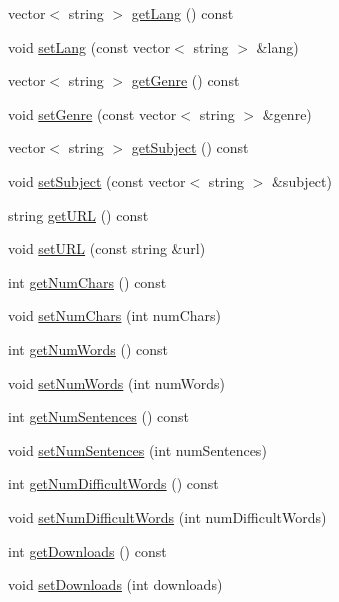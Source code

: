 \begin{DoxyCompactItemize}
\item 
vector$<$ string $>$ \hyperlink{classbridges_1_1_book_abb74d8c97070e1c3ead2d1223bfa420c}{get\+Lang} () const 
\item 
void \hyperlink{classbridges_1_1_book_a7c96cf79f310f78eb16035c6874afa05}{set\+Lang} (const vector$<$ string $>$ \&lang)
\item 
vector$<$ string $>$ \hyperlink{classbridges_1_1_book_a0a7091fa2f7501bac398bbe8fb88a2bd}{get\+Genre} () const 
\item 
void \hyperlink{classbridges_1_1_book_a3743b908548b944543af533b030a1eca}{set\+Genre} (const vector$<$ string $>$ \&genre)
\item 
vector$<$ string $>$ \hyperlink{classbridges_1_1_book_a16bde0ed60d0c3c3b2e3affd6de2f95a}{get\+Subject} () const 
\item 
void \hyperlink{classbridges_1_1_book_aff19a506929a6df5503e2cd3e293381e}{set\+Subject} (const vector$<$ string $>$ \&subject)
\item 
string \hyperlink{classbridges_1_1_book_a7cfb6efd92ca5e02b5874dc3c2bb070b}{get\+U\+R\+L} () const 
\item 
void \hyperlink{classbridges_1_1_book_a48d590f296837b8eb9ac10451c83d23b}{set\+U\+R\+L} (const string \&url)
\item 
int \hyperlink{classbridges_1_1_book_aa53d57e2eb2e53262bccb9273b5178fb}{get\+Num\+Chars} () const 
\item 
void \hyperlink{classbridges_1_1_book_a31f85f174ab86e6f9eb2131c3dbe1cdf}{set\+Num\+Chars} (int num\+Chars)
\item 
int \hyperlink{classbridges_1_1_book_ad6223c79c9ba0b4920e3bba81123c5fb}{get\+Num\+Words} () const 
\item 
void \hyperlink{classbridges_1_1_book_acbed3f0ff253868d8747826a27ef30ac}{set\+Num\+Words} (int num\+Words)
\item 
int \hyperlink{classbridges_1_1_book_a306ca71439518223ad4bb3c5329fd1a8}{get\+Num\+Sentences} () const 
\item 
void \hyperlink{classbridges_1_1_book_af16061c14c40b1672c7801a4c3a2d33b}{set\+Num\+Sentences} (int num\+Sentences)
\item 
int \hyperlink{classbridges_1_1_book_a8d769f0d1ddf5cf6809c72f9640fd6d8}{get\+Num\+Difficult\+Words} () const 
\item 
void \hyperlink{classbridges_1_1_book_adc7a54f2a494aeac02cadb3eb4caedbc}{set\+Num\+Difficult\+Words} (int num\+Difficult\+Words)
\item 
int \hyperlink{classbridges_1_1_book_a49369c8d0e5a1d5b0dcffaf39f4c1343}{get\+Downloads} () const 
\item 
void \hyperlink{classbridges_1_1_book_aa3e894e59ae043e7271861772b03632c}{set\+Downloads} (int downloads)
\end{DoxyCompactItemize}


